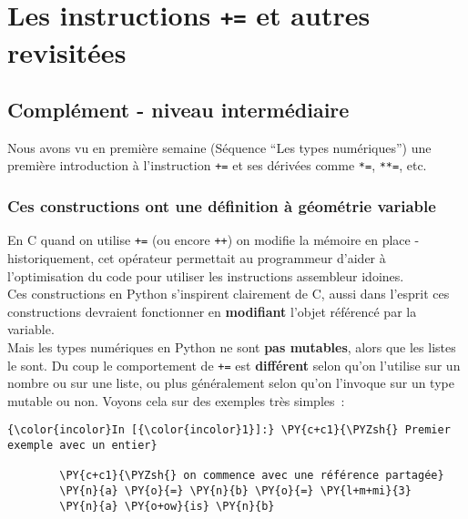     \hypertarget{les-instructions-et-autres-revisituxe9es}{%
\section{\texorpdfstring{Les instructions \texttt{+=} et autres
revisitées}{Les instructions += et autres revisitées}}\label{les-instructions-et-autres-revisituxe9es}}

    \hypertarget{compluxe9ment---niveau-intermuxe9diaire}{%
\subsection{Complément - niveau
intermédiaire}\label{compluxe9ment---niveau-intermuxe9diaire}}

    Nous avons vu en première semaine (Séquence ``Les types numériques'')
une première introduction à l'instruction \texttt{+=} et ses dérivées
comme \texttt{*=}, \texttt{**=}, etc.

    \hypertarget{ces-constructions-ont-une-duxe9finition-uxe0-guxe9omuxe9trie-variable}{%
\subsubsection{Ces constructions ont une définition à géométrie
variable}\label{ces-constructions-ont-une-duxe9finition-uxe0-guxe9omuxe9trie-variable}}

    En C quand on utilise \texttt{+=} (ou encore \texttt{++}) on modifie la
mémoire en place - historiquement, cet opérateur permettait au
programmeur d'aider à l'optimisation du code pour utiliser les
instructions assembleur idoines.\\

Ces constructions en Python s'inspirent clairement de C, aussi dans
l'esprit ces constructions devraient fonctionner en \textbf{modifiant}
l'objet référencé par la variable.\\

Mais les types numériques en Python ne sont \textbf{pas mutables}, alors
que les listes le sont. Du coup le comportement de \texttt{+=} est
\textbf{différent} selon qu'on l'utilise sur un nombre ou sur une liste,
ou plus généralement selon qu'on l'invoque sur un type mutable ou non.
Voyons cela sur des exemples très simples~:

    \begin{Verbatim}[commandchars=\\\{\}]
{\color{incolor}In [{\color{incolor}1}]:} \PY{c+c1}{\PYZsh{} Premier exemple avec un entier}
        
        \PY{c+c1}{\PYZsh{} on commence avec une référence partagée}
        \PY{n}{a} \PY{o}{=} \PY{n}{b} \PY{o}{=} \PY{l+m+mi}{3}
        \PY{n}{a} \PY{o+ow}{is} \PY{n}{b}
\end{Verbatim}


